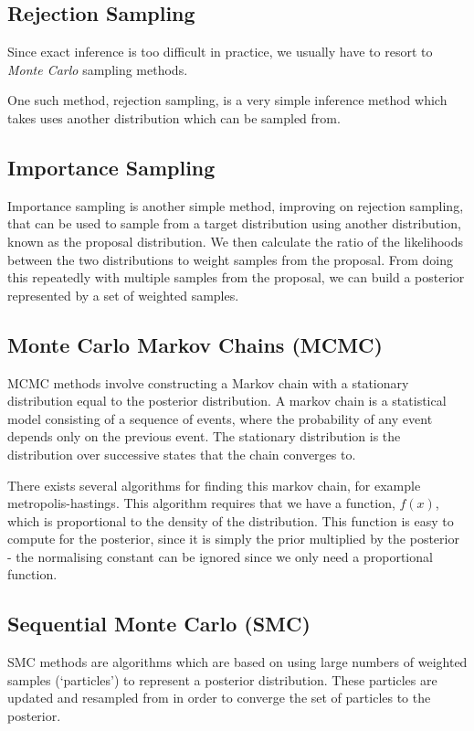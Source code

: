 \subsection{Rejection Sampling}

Since exact inference is too difficult in practice, we usually have to resort to \textit{Monte Carlo} sampling methods.

One such method, rejection sampling, is a very simple inference method which takes uses another distribution which can be sampled from.

\subsection{Importance Sampling}

Importance sampling is another simple method, improving on rejection sampling, that can be used to sample from a target distribution using another distribution, known as the proposal distribution. We then calculate the ratio of the likelihoods between the two distributions to weight samples from the proposal. From doing this repeatedly with multiple samples from the proposal, we can build a posterior represented by a set of weighted samples.


\subsection{Monte Carlo Markov Chains (MCMC)}

MCMC methods involve constructing a Markov chain with a stationary distribution equal to the posterior distribution. A markov chain is a statistical model consisting of a sequence of events, where the probability of any event depends only on the previous event. The stationary distribution is the distribution over successive states that the chain converges to.

There exists several algorithms for finding this markov chain, for example metropolis-hastings. This algorithm requires that we have a function, $f(x)$, which is proportional to the density of the distribution. This function is easy to compute for the posterior, since it is simply the prior multiplied by the posterior - the normalising constant can be ignored since we only need a proportional function.

\subsection{Sequential Monte Carlo (SMC)}

SMC methods are algorithms which are based on using large numbers of weighted samples (`particles') to represent a posterior distribution. These particles are updated and resampled from in order to converge the set of particles to the posterior.

